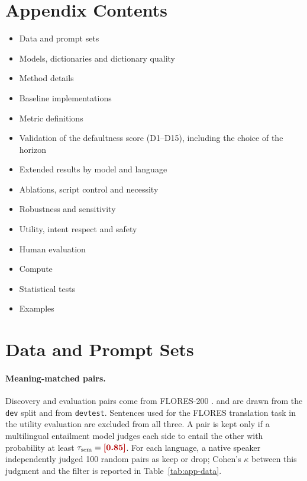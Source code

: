 
\section*{Appendix Contents}
\begin{itemize}[leftmargin=*,itemsep=0pt,topsep=2pt]
  \item[\ref{app:data}] Data and prompt sets
  \item[\ref{app:sae-quality}] Models, dictionaries and dictionary quality
  \item[\ref{app:stage2}] Method details
  \item[\ref{app:baselines}] Baseline implementations
  \item[\ref{app:metrics}] Metric definitions
  \item[\ref{app:metric-suite}] Validation of the defaultness score (D1--D15), including the choice of the horizon
  \item[\ref{app:extended}] Extended results by model and language
  \item[\ref{app:mechanism}] Ablations, script control and necessity
  \item[\ref{app:robustness}] Robustness and sensitivity
  \item[\ref{app:intent}] Utility, intent respect and safety
  \item[\ref{app:human}] Human evaluation
  \item[\ref{app:cost}] Compute
  \item[\ref{app:stats}] Statistical tests
  \item[\ref{app:examples}] Examples
\end{itemize}

\FloatBarrier
\section{Data and Prompt Sets}
\label{app:data}

\paragraph{Meaning-matched pairs.}
Discovery and evaluation pairs come from FLORES-200 \citep{flores200}. \Ddisc and \Ddev are drawn from the \texttt{dev} split and \Deval from \texttt{devtest}. Sentences used for the FLORES translation task in the utility evaluation are excluded from all three. A pair is kept only if a multilingual entailment model judges each side to entail the other with probability at least $\tau_{\mathrm{sem}}=\res{0.85}$. For each language, a native speaker independently judged 100 random pairs as keep or drop; Cohen's $\kappa$ \citep{cohen1960kappa} between this judgment and the filter is reported in Table~\ref{tab:app-data}.

